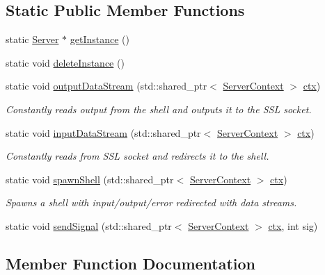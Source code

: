 \subsection*{Static Public Member Functions}
\begin{DoxyCompactItemize}
\item 
static \hyperlink{classServer}{Server} $\ast$ \hyperlink{classServer_a22dbfd5db73d391d615a0bfd69077fb6}{get\+Instance} ()
\item 
static void \hyperlink{classServer_a727200ae46569af9054fac429c7da43e}{delete\+Instance} ()
\item 
static void \hyperlink{classServer_a0b247f8f2166b36c3575c4678d0755e9}{output\+Data\+Stream} (std\+::shared\+\_\+ptr$<$ \hyperlink{structServerContext}{Server\+Context} $>$ \hyperlink{shell_2src_2main_8cpp_aabb454f84e785177301ba543d88067a7}{ctx})
\begin{DoxyCompactList}\small\item\em Constantly reads output from the shell and outputs it to the S\+SL socket. \end{DoxyCompactList}\item 
static void \hyperlink{classServer_a8d9328ec355e42c8abf49ae0d4771399}{input\+Data\+Stream} (std\+::shared\+\_\+ptr$<$ \hyperlink{structServerContext}{Server\+Context} $>$ \hyperlink{shell_2src_2main_8cpp_aabb454f84e785177301ba543d88067a7}{ctx})
\begin{DoxyCompactList}\small\item\em Constantly reads from S\+SL socket and redirects it to the shell. \end{DoxyCompactList}\item 
static void \hyperlink{classServer_a4e9f6422ec55d311b9588975f81ae3bd}{spawn\+Shell} (std\+::shared\+\_\+ptr$<$ \hyperlink{structServerContext}{Server\+Context} $>$ \hyperlink{shell_2src_2main_8cpp_aabb454f84e785177301ba543d88067a7}{ctx})
\begin{DoxyCompactList}\small\item\em Spawns a shell with input/output/error redirected with data streams. \end{DoxyCompactList}\item 
static void \hyperlink{classServer_a180800432b9ecffdbc050f4c66f8abd2}{send\+Signal} (std\+::shared\+\_\+ptr$<$ \hyperlink{structServerContext}{Server\+Context} $>$ \hyperlink{shell_2src_2main_8cpp_aabb454f84e785177301ba543d88067a7}{ctx}, int sig)
\end{DoxyCompactItemize}


\subsection{Member Function Documentation}
